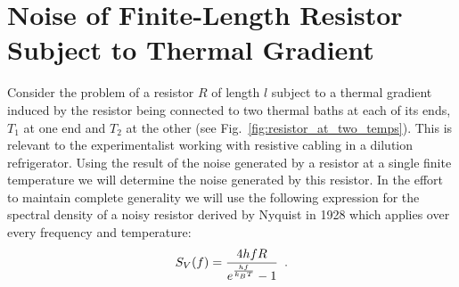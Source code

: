 \documentclass{article}
\begin{document}
\maketitle

\newpage
\tableofcontents
\newpage

\section{Noise of Finite-Length Resistor Subject to Thermal Gradient}
\label{sec:noise_of_finite_length_resistor_subject_to_thermal_gradient}

Consider the problem of a resistor $ R $ of length $ l $ subject to a thermal
gradient induced by the resistor being connected to two thermal baths at each of
its ends, $ T_{1} $ at one end and $ T_{2} $ at the other (see
Fig.~\ref{fig:resistor_at_two_temps}). This is relevant to the experimentalist
working with resistive cabling in a dilution refrigerator. Using the result of
the noise generated by a resistor at a single finite temperature we will
determine the noise generated by this resistor. In the effort to maintain
complete generality we will use the following expression for the spectral
density of a noisy resistor derived by Nyquist in 1928 which applies over every
frequency and temperature\cite{Nyquist1928}:
\begin{equation}
   S_{V}(f) = \frac{4 h f R}{e^{\frac{hf}{k_{B}T}}-1} \enskip.
   \label{eq:nyqist_noise_expression}
\end{equation}
\end{document}
